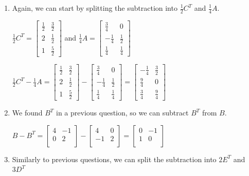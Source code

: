 \documentclass[11pt, letterpaper, twoside]{article}
\begin{document}
\begin{enumerate}
\begin{enumerate}[label=(\alph*)]
\item Again, we can start by splitting the subtraction into $\frac {1}{2}C^T$ and $\frac {1}{4}A$.

$\frac {1}{2}C^T=\begin{bmatrix}
\frac {1}{2} & \frac{3}{2}\\
2 & \frac{1}{2}\\
1 & \frac{5}{2}
\end{bmatrix}$ and $\frac{1}{4} A = \begin{bmatrix}
\frac{3}{4} & 0\\
-\frac{1}{4} & \frac{1}{2}\\
\frac{1}{4} & \frac{1}{4}
\end{bmatrix}$

$\frac{1}{2}C^T-\frac{1}{4}A=\begin{bmatrix}
\frac {1}{2} & \frac{3}{2}\\
2 & \frac{1}{2}\\
1 & \frac{5}{2}
\end{bmatrix}-
\begin{bmatrix}
\frac{3}{4} & 0\\
-\frac{1}{4} & \frac{1}{2}\\
\frac{1}{4} & \frac{1}{4}
\end{bmatrix}
=\begin{bmatrix}
-\frac{1}{4} & \frac{3}{2}\\
\frac{9}{4} & 0\\
\frac{3}{4} & \frac{9}{4}
\end{bmatrix}$

\item We found $B^T$ in a previous question, so we can subtract $B^T$ from $B$.

$B-B^T=\begin{bmatrix}
4 & -1\\
0 & 2\\
\end{bmatrix}-
\begin{bmatrix}
4 & 0\\
-1 & 2\\
\end{bmatrix}
=\begin{bmatrix}
0 & -1\\
1 & 0\\
\end{bmatrix}$

\item Similarly to previous questions, we can split the subtraction into $2E^T$ and $3D^T$


\end{enumerate}
\end{enumerate}
\end{document}
